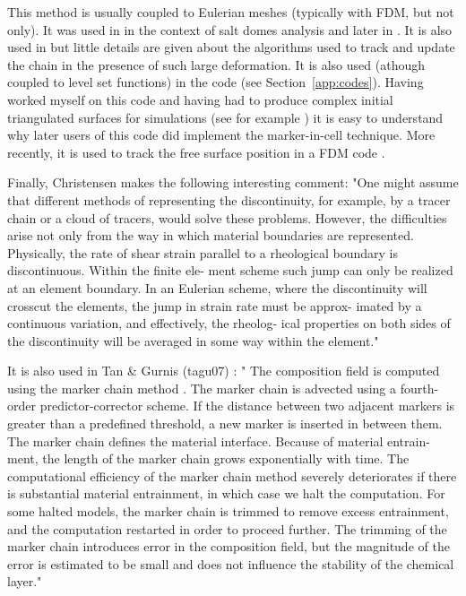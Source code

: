 This method is usually coupled to Eulerian meshes (typically with FDM, but not only). 
It was used in \cite{woid78} in the context of salt domes analysis and later in \cite{chri82,chyu84}.
It is also used in \cite{vaks97} but little details are given about the algorithms used
to track and update the chain in the presence of such large deformation.
It is also used (athough coupled to level set functions) in the \douar code\cite{brtf08} 
(see Section~\ref{app:codes}). Having worked myself on this code and having had to produce 
complex initial triangulated surfaces for simulations (see for example \cite{lobh10}) it is 
easy to understand why later users of this code did implement the marker-in-cell technique.
More recently, it is used to track the free surface position in a FDM code \cite{dumy16,chmd19}.

Finally, Christensen \cite{chri92} makes the following interesting comment:  
"One might assume that different methods 
of representing the discontinuity, for example, by a tracer chain \cite{chyu84} or a cloud of 
tracers, would solve these problems. However, the difficulties 
arise not only from the way in which material boundaries are 
represented. Physically, the rate of shear strain parallel to a 
rheological boundary is discontinuous. Within the finite ele-
ment scheme such jump can only be realized at an element 
boundary. In an Eulerian scheme, where the discontinuity will 
crosscut the elements, the jump in strain rate must be approx- 
imated by a continuous variation, and effectively, the rheolog-
ical properties on both sides of the discontinuity will be 
averaged in some way within the element."

It is also used in Tan \& Gurnis (tagu07) \cite{tagu07}: "
The composition field is computed using the marker
chain method \cite{dagu86,vaks97}. The marker chain is advected using a fourth-order
predictor-corrector scheme. If the distance between two
adjacent markers is greater than a predefined threshold, a
new marker is inserted in between them. The marker chain
defines the material interface. Because of material entrain-
ment, the length of the marker chain grows exponentially
with time. The computational efficiency of the marker chain
method severely deteriorates if there is substantial material
entrainment, in which case we halt the computation. For
some halted models, the marker chain is trimmed to remove
excess entrainment, and the computation restarted in order
to proceed further. The trimming of the marker chain
introduces error in the composition field, but the magnitude
of the error is estimated to be small and does not influence
the stability of the chemical layer."

